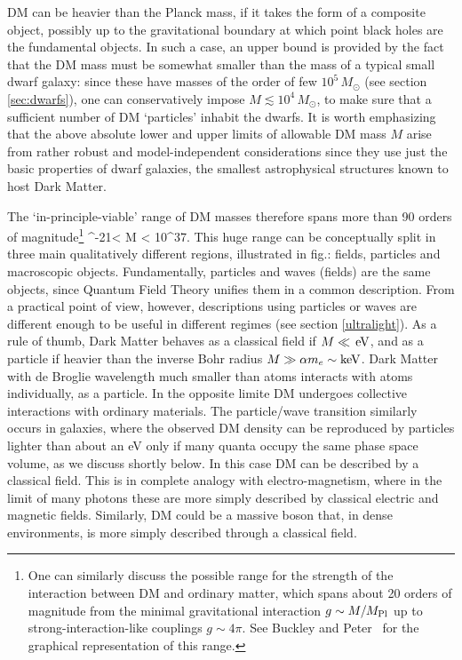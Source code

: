 DM can be heavier than the Planck mass, if it takes the form of a composite object, possibly up to the gravitational boundary
at which point black holes are the fundamental objects. In such a case, an upper bound is provided by the fact that the DM mass must be somewhat smaller than the mass of a typical small dwarf galaxy: since these have masses of the order of few $10^5 \, M_\odot$ (see section \ref{sec:dwarfs}), one can conservatively impose $M \lesssim 10^4 \, M_\odot$, to make sure that a sufficient number of DM `particles' inhabit the dwarfs.
It is worth emphasizing that the above absolute lower and upper limits of allowable DM mass $M$ arise from rather robust and model-independent considerations since they use just the basic properties of dwarf galaxies, the smallest astrophysical structures known to host Dark Matter. 

The `in-principle-viable' range of DM masses therefore  spans more than 90 orders of magnitude\footnote{One can similarly discuss the possible range for the strength of the interaction between DM and ordinary matter, which spans about 20 orders of magnitude from the minimal gravitational interaction $g \sim M/M_{\rm Pl}$ up to
strong-interaction-like couplings $g\sim 4\pi$. See Buckley and Peter~\cite{otherpastDMreviews} for the graphical representation of this range.}
^{-21}\eV < M < 10^{37}\kg.
\label{eq:DMmassrange}
\eeq
This huge range can be conceptually split in three main qualitatively different regions, illustrated in fig.: fields, particles and macroscopic objects.
Fundamentally, particles and waves (fields) are the same objects, since 
Quantum Field Theory unifies them in a common description. 
 From a practical point of view, however, descriptions using particles or waves are different enough to be useful in different regimes (see section \ref{ultralight}).
As a rule of thumb, Dark Matter behaves as a classical field if $M \ll \,{\rm eV}$,
and as a particle if  heavier than the inverse Bohr radius $M \gg  \alpha m_e\sim  {\rm keV}$.
Dark Matter with de Broglie wavelength much smaller than atoms interacts with atoms individually, as a particle.
In the opposite limite DM undergoes collective interactions with ordinary materials.
The particle/wave transition similarly occurs in galaxies, where the observed DM density
can be reproduced by particles lighter than about an eV only if many quanta occupy the same phase space volume,
as we discuss shortly below. In this case DM can be described by a classical field. 
This is in complete analogy with electro-magnetism, where in the limit of many photons these are more simply described by classical electric and magnetic fields. Similarly, DM could be a massive boson that, in dense environments, is more simply described through a classical field.



